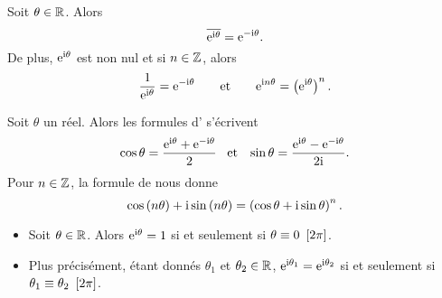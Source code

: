 \documentclass{magnolia}
\begin{document}
\begin{proposition}[utile=-3]
Soit $\theta\in\mathbb{R}$. Alors
\[\overline{{\rm e}^{{\rm i}\theta}}={\rm e}^{-{\rm i}\theta}.\]
De plus, ${\rm e}^{{\rm i}\theta}$ est non nul et si $n\in\mathbb{Z}$, alors
\[\frac{1}{{\rm e}^{{\rm i}\theta}}={\rm e}^{-{\rm i}\theta} \qquad\text{et}\qquad {\rm e}^{{\rm i} n\theta}=
  \left({\rm e}^{{\rm i} \theta}\right)^n.\]  
\end{proposition}


\begin{proposition}[utile=-3, nom={Formules d'\nom{Euler} et \nom{Moivre}}]
Soit $\theta$ un réel. Alors les formules d' s'écrivent
\[\cos\theta=\frac{{\rm e}^{{\rm i} \theta}+{\rm e}^{-{\rm i}\theta}}{2} \quad\!\text{et}\quad\!
  \sin\theta=\frac{{\rm e}^{{\rm i} \theta}-{\rm e}^{-{\rm i}\theta}}{2{\rm i}}.\]
Pour $n\in\mathbb{Z}$, la formule de  nous donne
\[\cos \left(n\theta\right)+{\rm i}\sin\left(n\theta\right)=\left(\cos \theta+{\rm i}\sin \theta\right)^n.\]
\end{proposition}


\begin{proposition}[utile=-3]
\begin{itemize}
\item Soit $\theta\in\mathbb{R}$. Alors ${\rm e}^{{\rm i}\theta}=1$ si et seulement si
  $\theta\equiv 0\ \left[2\pi\right]$.
\item Plus précisément, étant donnés $\theta_1$ et $\theta_2\in\mathbb{R}$,
  ${\rm e}^{{\rm i}\theta_1}={\rm e}^{{\rm i}\theta_2}$ si et seulement si
  $\theta_1\equiv\theta_2\ \cro{2\pi}$.
\end{itemize}
\end{proposition}
\end{document}
